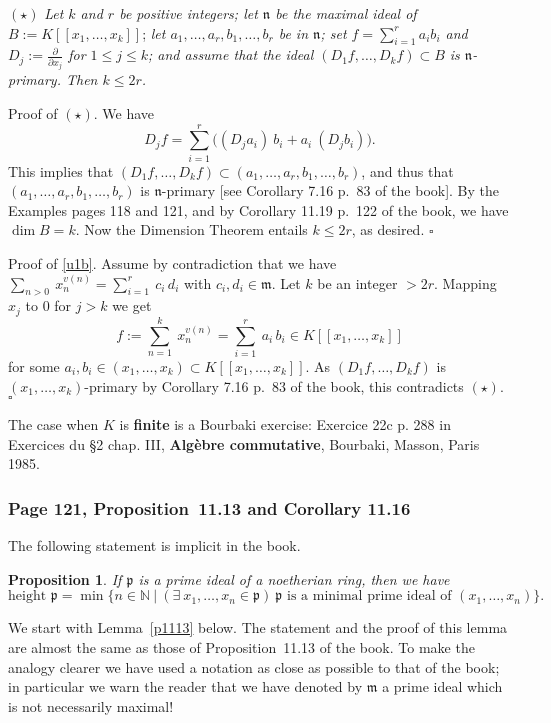 \documentclass[12pt,letterpaper]{article}%
\newcommand{\mf}{\mathfrak}
\newcommand{\mmm}{\mf m}
\newcommand{\ppp}{\mf p}
\newcommand{\nn}{\noindent}
\newtheorem{prop}[thm]{Proposition}
\begin{document}
\nn$(\star)$ {\em Let $k$ and $r$ be positive integers; let $\mathfrak n$ be the maximal ideal of} $B:=K[[x_1,\dots,x_k]]$; \emph{let $a_1,\dots,a_r,b_1,\dots,b_r$ be in $\mathfrak n$; set $f=\sum_{i=1}^ra_ib_i$ and $D_j:=\frac{\partial}{\partial x_j}$ for $1\le j\le k$; and assume that the ideal $(D_1f,\dots,D_kf)\subset B$ is $\mathfrak n$-primary. Then $k\le2r$.}

\nn Proof of $(\star)$. We have 
$$
D_jf=\sum_{i=1}^r\Big((D_ja_i)\ b_i+a_i\ (D_jb_i)\Big). 
$$ 
This implies that $(D_1f,\dots,D_kf)\subset(a_1,\dots,a_r,b_1,\dots,b_r)$, and thus that $(a_1,\dots,a_r,b_1,\dots,b_r)$ is $\mathfrak n$-primary [see Corollary 7.16 p.~83 of the book]. By the Examples pages 118 and 121, and by Corollary 11.19 p.~122 of the book, we have $\dim B=k$. Now the Dimension Theorem entails $k\le2r$, as desired. $\square$

\nn Proof of \eqref{u1b}. Assume by contradiction that we have 
$
\sum_{n>0}\ x_n^{v(n)}=\sum_{i=1}^r\ c_i\,d_i
$ 
with $c_i,d_i\in\mmm$. Let $k$ be an integer $>2r$. Mapping $x_j$ to $0$ for $j>k$ we get 
$$
f:=\sum_{n=1}^k\ x_n^{v(n)}=\sum_{i=1}^r\ a_i\,b_i\in K[[x_1,\dots,x_k]]
$$ 
for some $a_i,b_i\in(x_1,\dots,x_k)\subset K[[x_1,\dots,x_k]]$. As $(D_1f,\dots,D_kf)$ is $(x_1,\dots,x_k)$-primary by Corollary 7.16 p.~83 of the book, this contradicts $(\star)$. $\square$

The case when $K$ is \textbf{finite} is a Bourbaki exercise: Exercice 22c p. 288 in Exercices du \S2 chap. III, \textbf{Algèbre commutative}, Bourbaki, Masson, Paris 1985.

\subsubsection{Page 121, Proposition~11.13 and Corollary 11.16}\label{1116}%

The following statement is implicit in the book. 
\begin{prop}\label{myprop}
If $\ppp$ is a prime ideal of a noetherian ring, then we have 
$$
\text{height }\ppp=\min\big\{n\in\mathbb N\ |\ (\exists\ x_1,\ldots,x_n\in\ppp)\ \ppp\text{ is a minimal prime ideal of }(x_1,\ldots,x_n)\big\}.
$$ 
\end{prop} 
We start with Lemma~\ref{p1113} below. The statement and the proof of this lemma are  almost the same as those of Proposition~11.13 of the book. To make the analogy clearer we have used a notation as close as possible to that of the book; in particular we warn the reader that we have denoted by $\mmm$ a prime ideal which is not necessarily maximal!
\end{document}

